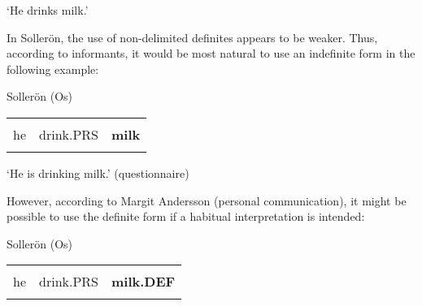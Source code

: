 \begin{styleTranslation}
‘He drinks milk.’

\end{styleTranslation}

\begin{styleBodyTextFirst}
In Sollerön, the use of non-delimited definites appears to be weaker. Thus, according to informants, it would be most natural to use an indefinite form in the following example:

\end{styleBodyTextFirst}

\begin{listWWNumileveli}
\item 

\begin{styleExample}
Sollerön (Os) 

\end{styleExample}

\end{listWWNumileveli}

\begin{tabular}{lll}
\lsptoprule
\multicolumn{3}{l}{An

}\\
he & drink.PRS & {\bfseries milk}\\
\lspbottomrule
\end{tabular}

\begin{styleTranslation}
‘He is drinking milk.’ (questionnaire)

\end{styleTranslation}

\begin{styleBodyTextFirst}
However, according to Margit Andersson (personal communication), it might be possible to use the definite form if a habitual interpretation is intended:

\end{styleBodyTextFirst}

\begin{listWWNumileveli}
\item 

\begin{styleExample}
\label{bkm:Ref173318047}Sollerön (Os) 

\end{styleExample}

\end{listWWNumileveli}

\begin{tabular}{lll}
\lsptoprule
\multicolumn{3}{l}{An

}\\
he & drink.PRS & {\bfseries milk.DEF}\\
\lspbottomrule
\end{tabular}


